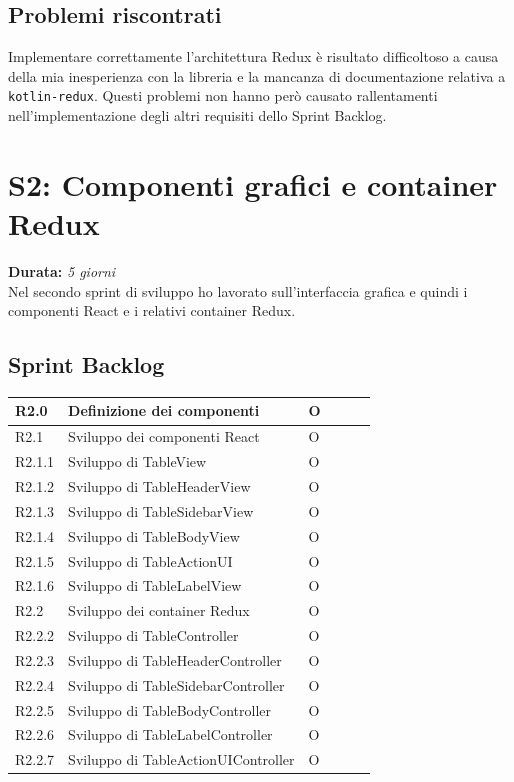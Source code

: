 \subsection{Problemi riscontrati}
Implementare correttamente l'architettura Redux è risultato difficoltoso a causa della mia inesperienza con la libreria e la mancanza di documentazione relativa a \verb|kotlin-redux|. Questi problemi non hanno però causato rallentamenti nell'implementazione degli altri requisiti dello Sprint Backlog.

\newpage

\section{S2: Componenti grafici e container Redux}
\textbf{Durata:} \textit{5 giorni} \\
Nel secondo sprint di sviluppo ho lavorato sull'interfaccia grafica e quindi i componenti React e i relativi container Redux.

\subsection{Sprint Backlog}
\begin{longtable} {
		|>{}p{10mm}| 
		|>{}p{90mm}|
		|>{}p{15mm}|
		|>{}p{15mm}|
		|>{}p{15mm}|
		>{}p{0mm}}
	\hline
R2.0   & \textbf{Definizione dei componenti} & O\\ \hline
R2.1   & Sviluppo dei componenti React 		  & O\\ \hline
R2.1.1 & Sviluppo di TableView                & O\\ \hline
R2.1.2 & Sviluppo di TableHeaderView          & O\\ \hline
R2.1.3 & Sviluppo di TableSidebarView         & O \\ \hline
R2.1.4 & Sviluppo di TableBodyView            & O\\ \hline
R2.1.5 & Sviluppo di TableActionUI            & O\\ \hline
R2.1.6 & Sviluppo di TableLabelView            & O\\ \hline
R2.2   & Sviluppo dei container Redux         & O  \\ \hline
R2.2.2 & Sviluppo di TableController          & O   \\ \hline
R2.2.3 & Sviluppo di TableHeaderController    & O      \\ \hline
R2.2.4 & Sviluppo di TableSidebarController   & O      \\ \hline
R2.2.5 & Sviluppo di TableBodyController      & O   \\ \hline
R2.2.6 & Sviluppo di TableLabelController   & O      \\ \hline
R2.2.7 & Sviluppo di TableActionUIController      & O   \\ \hline
\end{longtable}


